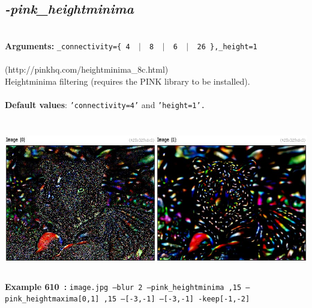 \documentclass[a4paper,11pt,twoside]{book}
\begin{document}
\subsection{\emph{-pink\_heightminima} }\vspace*{-0.5em}
~\\\textbf{Arguments: } 
{\small \texttt{\_connectivity=\{ 4 ~$|$~ 8 ~$|$~ 6 ~$|$~ 26 \},\_height=1}}\\~\\
(http://pinkhq.com/heightminima\_8c.html)
~\\Heightminima filtering (requires the PINK library to be installed).
~\\~\\\textbf{Default values}: {\small \texttt{'connectivity=4'} and \texttt{'height=1'.}}
\begin{center}\includegraphics[keepaspectratio=true,height=7cm,width=\textwidth]{img/gmic_def610.jpg}\\
{\footnotesize \textbf{Example 610~:} \texttt{image.jpg --blur 2 --pink\_heightminima ,15 --pink\_heightmaxima[0,1] ,15 --[-3,-1] --[-3,-1] -keep[-1,-2]}}
\end{center}
\end{document}
